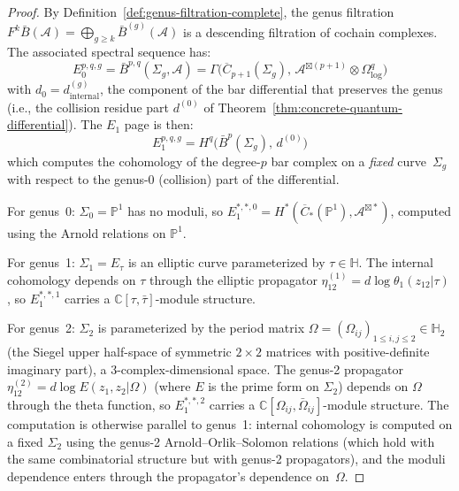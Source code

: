 \begin{proof}
By Definition~\ref{def:genus-filtration-complete}, the genus filtration $F^k\bar{B}(\mathcal{A}) = \bigoplus_{g \geq k} \bar{B}^{(g)}(\mathcal{A})$ is a descending filtration of cochain complexes.  The associated spectral sequence has:
\[
E_0^{p,q,g} = \bar{B}^{p,q}(\Sigma_g, \mathcal{A}) = \Gamma\bigl(\overline{C}_{p+1}(\Sigma_g),\, \mathcal{A}^{\boxtimes(p+1)} \otimes \Omega^q_{\log}\bigr)
\]
with $d_0 = d^{(g)}_{\mathrm{internal}}$, the component of the bar differential that preserves the genus (i.e., the collision residue part $d^{(0)}$ of Theorem~\ref{thm:concrete-quantum-differential}).  The $E_1$ page is then:
\[
E_1^{p,q,g} = H^q\bigl(\bar{B}^p(\Sigma_g),\, d^{(0)}\bigr)
\]
which computes the cohomology of the degree-$p$ bar complex on a \emph{fixed} curve~$\Sigma_g$ with respect to the genus-0 (collision) part of the differential.

For genus~0: $\Sigma_0 = \mathbb{P}^1$ has no moduli, so $E_1^{*,*,0} = H^*(\overline{C}_*(\mathbb{P}^1), \mathcal{A}^{\boxtimes *})$, computed using the Arnold relations on $\mathbb{P}^1$.

For genus~1: $\Sigma_1 = E_\tau$ is an elliptic curve parameterized by $\tau \in \mathbb{H}$.  The internal cohomology depends on $\tau$ through the elliptic propagator $\eta_{12}^{(1)} = d\log\theta_1(z_{12}|\tau)$, so $E_1^{*,*,1}$ carries a $\mathbb{C}[\tau,\bar{\tau}]$-module structure.

For genus~2: $\Sigma_2$ is parameterized by the period matrix $\Omega = (\Omega_{ij})_{1 \leq i,j \leq 2} \in \mathbb{H}_2$ (the Siegel upper half-space of symmetric $2 \times 2$ matrices with positive-definite imaginary part), a $3$-complex-dimensional space.  The genus-2 propagator $\eta_{12}^{(2)} = d\log E(z_1, z_2 | \Omega)$ (where $E$ is the prime form on $\Sigma_2$) depends on $\Omega$ through the theta function, so $E_1^{*,*,2}$ carries a $\mathbb{C}[\Omega_{ij}, \bar{\Omega}_{ij}]$-module structure.  The computation is otherwise parallel to genus~1: internal cohomology is computed on a fixed $\Sigma_2$ using the genus-2 Arnold--Orlik--Solomon relations (which hold with the same combinatorial structure but with genus-2 propagators), and the moduli dependence enters through the propagator's dependence on~$\Omega$.
\end{proof}

